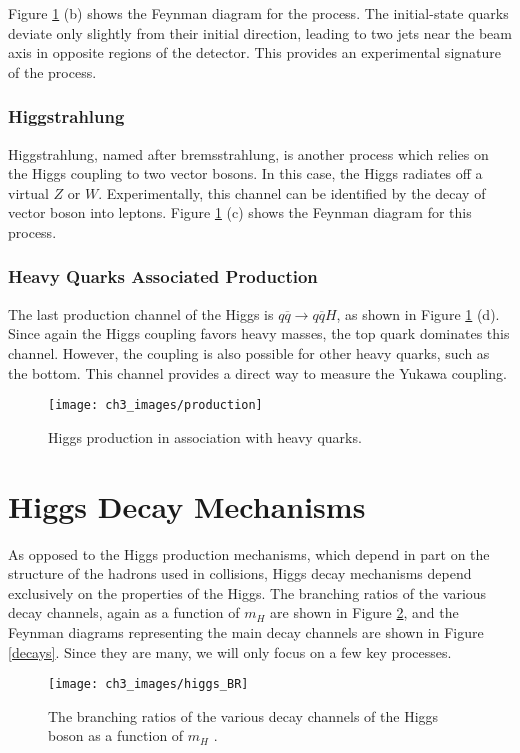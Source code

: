 \documentclass[10pt,a4paper]{book}
\begin{document}
Figure \ref{production} (b) shows the Feynman diagram for the process. The initial-state quarks deviate only slightly from their initial direction, leading to two jets near the beam axis in opposite regions of the detector. This provides an experimental signature of the process. 


\subsubsection{Higgstrahlung}
Higgstrahlung, named after bremsstrahlung, is another process which relies on the Higgs coupling to two vector bosons. In this case, the Higgs radiates off a virtual $Z$ or $W$. Experimentally, this channel can be identified by the decay of vector boson into leptons. Figure \ref{production} (c) shows the Feynman diagram for this process.


\subsubsection{Heavy Quarks Associated Production}
The last production channel of the Higgs is $q\overline{q}\rightarrow q\overline{q}H$, as shown in Figure \ref{production} (d). Since again the Higgs coupling favors heavy masses, the top quark dominates this channel. However, the coupling is also possible for other heavy quarks, such as the bottom. This channel provides a direct way to measure the Yukawa coupling.

\begin{figure}
\centering
\texttt{[image: ch3\_images/production]}
\caption{Higgs production in association with heavy quarks.}
\label{production}
\end{figure}

\section{Higgs Decay Mechanisms}
As opposed to the Higgs production mechanisms, which depend in part on the structure of the hadrons used in collisions, Higgs decay mechanisms depend exclusively on the properties of the Higgs. The branching ratios of the various decay channels, again as a function of $m_H$ are shown in Figure \ref{Higgs branching ratios}, and the Feynman diagrams representing the main decay channels are shown in Figure \ref{decays}. Since they are many, we will only focus on a few key processes.

\begin{figure}
\centering
\texttt{[image: ch3\_images/higgs\_BR]}
\caption{The branching ratios of the various decay channels of the Higgs boson as a function of $m_H$ \cite{LHCHiggsCrossSectionWorkingGroup:2013rie}.}
\label{Higgs branching ratios}
\end{figure}
\end{document}

